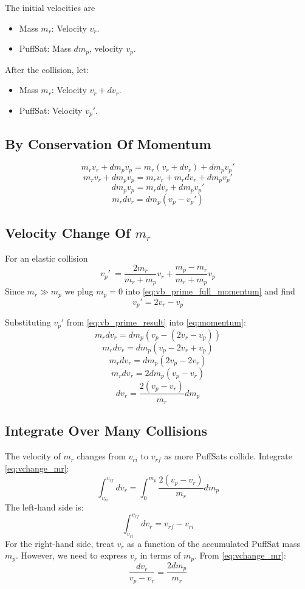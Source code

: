 \documentclass{article}
\begin{document}
The initial velocities are
\begin{itemize}
\item Mass \( m_r \): Velocity \( v_r \).
\item PuffSat: Mass \( dm_p \), velocity \( v_p \).
\end{itemize}
After the collision, let:
\begin{itemize}
    \item Mass \( m_r \): Velocity \( v_r + dv_r \).
    \item PuffSat: Velocity \( v_p' \).
\end{itemize}
\subsection{By Conservation Of Momentum} \[
m_r v_r + dm_p v_p = m_r (v_r + dv_r) + dm_p v_p'
\]
\[
m_r v_r + dm_p v_p = m_r v_r + m_r dv_r + dm_p v_p'
\]
\[
dm_p v_p = m_r dv_r + dm_p v_p'
\]
\begin{equation}
m_r dv_r = dm_p (v_p - v_p') \label{eq:momentum}
\end{equation}

\subsection[Velocity Change Of Rocket Mass]{Velocity Change Of \(m_r\)}
For an elastic collision
\begin{equation}
    v_p'\ = \frac{2m_r}{m_r+m_p}v_r + \frac{m_p-m_r}{m_r+m_p}v_p \label{eq:vb_prime_full_momentum}
\end{equation}
Since \(m_r \gg m_p\)   we plug \(m_p = 0\)  into \autoref{eq:vb_prime_full_momentum} and find 
\begin{equation}
v_p' = 2v_r - v_p  \label{eq:vb_prime_result}
\end{equation}      

Substituting \(v_p'\) from  \autoref{eq:vb_prime_result} into \autoref{eq:momentum}:
\[
m_r dv_r = dm_p (v_p - (2 v_r - v_p))
\]
\[
m_r dv_r = dm_p (v_p - 2 v_r + v_p)
\]
\[
m_r dv_r = dm_p (2 v_p - 2 v_r)
\]
\[
m_r dv_r = 2 dm_p (v_p - v_r)
\]
\begin{equation}
dv_r = \frac{2 (v_p - v_r)}{m_r} dm_p \label{eq:vchange_mr}
\end{equation}

\subsection{Integrate Over Many Collisions}
The velocity of \( m_r \) changes from \( v_{ri} \) to \( v_{rf} \) as more PuffSats collide. Integrate \autoref{eq:vchange_mr}:
\[
\int_{v_{ri}}^{v_{rf}} dv_r = \int_0^{m_p} \frac{2 (v_p - v_r)}{m_r} dm_p
\]
The left-hand side is:
\[
\int_{v_{ri}}^{v_{rf}} dv_r = v_{rf} - v_{ri}
\]
For the right-hand side, treat \( v_r \) as a function of the accumulated PuffSat mass \( m_p \). However, we need to express \( v_r \) in terms of \( m_p \). From \autoref{eq:vchange_mr}:
\begin{equation}
\frac{dv_r}{v_p - v_r} = \frac{2 dm_p}{m_r}\label{eq:dvr_velocity_relation}
\end{equation}
\end{document}
